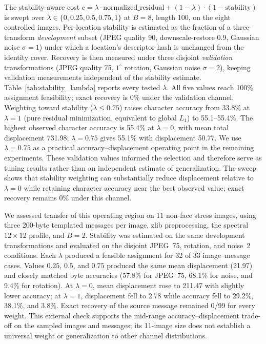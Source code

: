 \documentclass[preprint,12pt]{elsarticle}
\theoremstyle{plain}
\begin{document}
The stability-aware cost $c=\lambda\cdot\text{normalized\_residual}+(1-\lambda)\cdot(1-\text{stability})$
is swept over $\lambda\in\{0,0.25,0.5,0.75,1\}$ at $B=8$, length 100, on the
eight controlled images. Per-location stability is estimated as the fraction
of a three-transform \emph{development} subset (JPEG quality 90, downscale-restore
0.9, Gaussian noise $\sigma=1$) under which a location's descriptor hash is
unchanged from the identity cover. Recovery is then measured under three
disjoint \emph{validation} transformations (JPEG quality 75, $1^\circ$ rotation,
Gaussian noise $\sigma=2$), keeping validation measurements independent of
the stability estimate. Table~\ref{tab:stability_lambda} reports every tested
$\lambda$. All five values reach 100\% assignment feasibility; exact recovery
is 0\% under the validation channel. Weighting toward stability
($\lambda\leq0.75$) raises character accuracy from 33.8\% at $\lambda=1$
(pure residual minimization, equivalent to global $L_1$) to 55.1--55.4\%.
The highest observed character accuracy is 55.4\% at $\lambda=0$, with mean
total displacement 731.98; $\lambda=0.75$ gives 55.1\% with displacement
50.77. We use $\lambda=0.75$ as a practical accuracy--displacement operating
point in the remaining experiments. These validation values informed the
selection and therefore serve as tuning results rather than an independent
estimate of generalization. The sweep shows that stability weighting can
substantially reduce displacement relative to $\lambda=0$ while retaining
character accuracy near the best observed value; exact recovery remains 0\%
under this channel.

We assessed transfer of this operating region on 11 non-face stress images,
using three 200-byte templated messages per image, zlib preprocessing, the
spectral $12\times12$ profile, and $B=2$. Stability was estimated on the same
development transformations and evaluated on the disjoint JPEG~75, rotation,
and noise~2 conditions. Each $\lambda$ produced a feasible assignment for 32
of 33 image--message cases. Values $0.25$, $0.5$, and $0.75$ produced the same
mean displacement (21.97) and closely matched byte accuracies (57.8\% for
JPEG~75, 68.1\% for noise, and 9.4\% for rotation). At $\lambda=0$, mean
displacement rose to 211.47 with slightly lower accuracy; at $\lambda=1$,
displacement fell to 2.78 while accuracy fell to 29.2\%, 38.1\%, and 3.8\%.
Exact recovery of the source message remained 0/99 for every weight. This
external check supports the mid-range accuracy--displacement trade-off on the
sampled images and messages; its 11-image size does not establish a universal
weight or generalization to other channel distributions.
\end{document}
